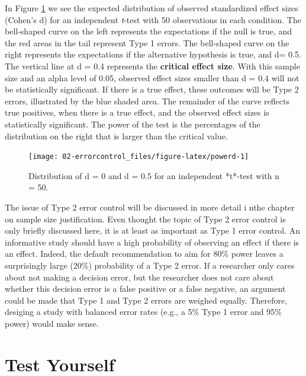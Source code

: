 \documentclass[
]{krantz}
\begin{document}
In Figure \ref{fig:powerd} we see the expected distribution of observed standardized effect sizes (Cohen's d) for an independent \emph{t}-test with 50 observations in each condition. The bell-shaped curve on the left represents the expectations if the null is true, and the red areas in the tail represent Type 1 errors. The bell-shaped curve on the right represents the expectations if the alternative hypothesis is true, and d= 0.5. The vertical line at d = 0.4 represents the \textbf{critical effect size}. With this sample size and an alpha level of 0.05, observed effect sizes smaller than d = 0.4 will not be statistically significant. If there is a true effect, these outcomes will be Type 2 errors, illustrated by the blue shaded area. The remainder of the curve reflects true positives, when there is a true effect, and the observed effect sizes is statistically significant. The power of the test is the percentages of the distribution on the right that is larger than the critical value.

\begin{figure}

{\centering \texttt{[image: 02-errorcontrol\_files/figure-latex/powerd-1]} 

}

\caption{Distribution of d = 0 and d = 0.5 for an independent *t*-test with n = 50.}\label{fig:powerd}
\end{figure}

The issue of Type 2 error control will be discussed in more detail i nthe chapter on sample size justification. Even thought the topic of Type 2 error control is only briefly discussed here, it is at least as important as Type 1 error control. An informative study should have a high probability of observing an effect if there is an effect. Indeed, the default recommendation to aim for 80\% power leaves a surprisingly large (20\%) probability of a Type 2 error. If a researcher only cares about not making a decision error, but the researcher does not care about whether this decision error is a false positive or a false negative, an argument could be made that Type 1 and Type 2 errors are weighed equally. Therefore, desiging a study with balanced error rates (e.g., a 5\% Type 1 error and 95\% power) would make sense.

\hypertarget{test-yourself-1}{%
\section{Test Yourself}\label{test-yourself-1}}
\end{document}
